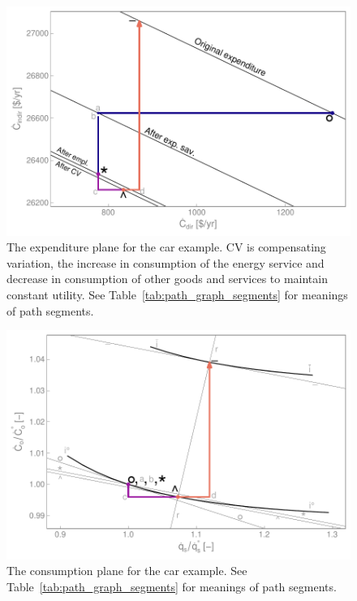 \documentclass[12pt]{article}\usepackage[]{graphicx}\usepackage[]{xcolor}
\makeatletter
\def\maxwidth{ %
  \ifdim\Gin@nat@width>\linewidth
    \linewidth
  \else
    \Gin@nat@width
  \fi
}
\newenvironment{knitrout}{}{} %
\makeatother
\begin{document}
\begin{knitrout}
\color{fgcolor}\begin{figure}

{\centering \includegraphics[width=\maxwidth]{figure/CarCostGraph-1} 

}

\caption{The expenditure plane for the car example. CV is compensating variation, the increase in consumption of the energy service and decrease in consumption of other goods and services to maintain constant utility. See Table~\ref{tab:path_graph_segments} for meanings of path segments.}\label{fig:CarCostGraph}
\end{figure}

\end{knitrout}


\begin{knitrout}
\color{fgcolor}\begin{figure}

{\centering \includegraphics[width=\maxwidth]{figure/CarConsGraph-1} 

}

\caption{The consumption plane for the car example. See Table~\ref{tab:path_graph_segments} for meanings of path segments.}\label{fig:CarConsGraph}
\end{figure}

\end{knitrout}
\end{document}
